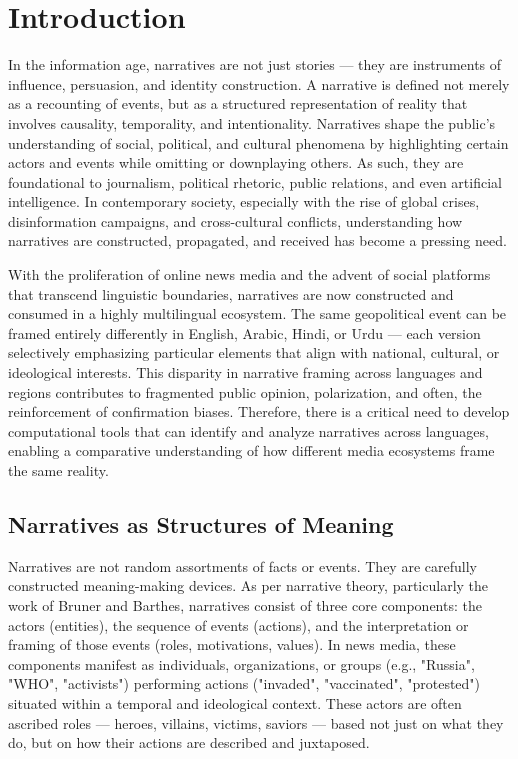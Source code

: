 \documentclass[12pt]{article}
\begin{document}
\newpage
\tableofcontents
\newpage

\section{Introduction}

In the information age, narratives are not just stories — they are instruments of influence, persuasion, and identity construction. A narrative is defined not merely as a recounting of events, but as a structured representation of reality that involves causality, temporality, and intentionality. Narratives shape the public's understanding of social, political, and cultural phenomena by highlighting certain actors and events while omitting or downplaying others. As such, they are foundational to journalism, political rhetoric, public relations, and even artificial intelligence. In contemporary society, especially with the rise of global crises, disinformation campaigns, and cross-cultural conflicts, understanding how narratives are constructed, propagated, and received has become a pressing need.

With the proliferation of online news media and the advent of social platforms that transcend linguistic boundaries, narratives are now constructed and consumed in a highly multilingual ecosystem. The same geopolitical event can be framed entirely differently in English, Arabic, Hindi, or Urdu — each version selectively emphasizing particular elements that align with national, cultural, or ideological interests. This disparity in narrative framing across languages and regions contributes to fragmented public opinion, polarization, and often, the reinforcement of confirmation biases. Therefore, there is a critical need to develop computational tools that can identify and analyze narratives across languages, enabling a comparative understanding of how different media ecosystems frame the same reality.

\subsection*{Narratives as Structures of Meaning}

Narratives are not random assortments of facts or events. They are carefully constructed meaning-making devices. As per narrative theory, particularly the work of Bruner and Barthes, narratives consist of three core components: the actors (entities), the sequence of events (actions), and the interpretation or framing of those events (roles, motivations, values). In news media, these components manifest as individuals, organizations, or groups (e.g., "Russia", "WHO", "activists") performing actions ("invaded", "vaccinated", "protested") situated within a temporal and ideological context. These actors are often ascribed roles — heroes, villains, victims, saviors — based not just on what they do, but on how their actions are described and juxtaposed.
\end{document}

